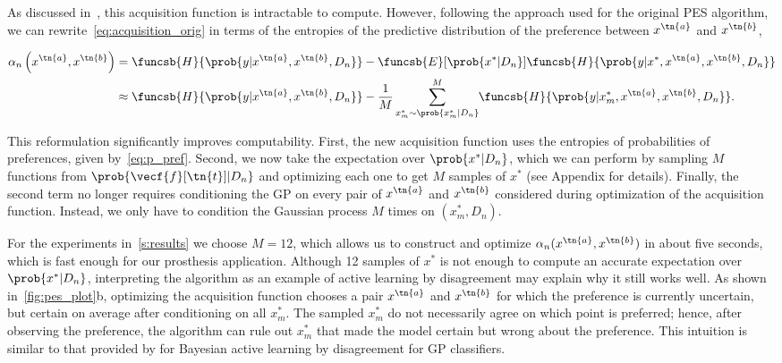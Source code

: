 As discussed in~\citep{hernandez2014predictive}, this acquisition function is
intractable to compute. However, following the approach used for the original
PES algorithm, we can rewrite~\cref{eq:acquisition_orig} in terms of the
entropies of the predictive distribution of the preference between $x^\tn{a}$
and $x^\tn{b}$,
\begin{fullwidth}
\begin{align}
    \alpha_n \left(x^\tn{a}, x^\tn{b} \right) &= 
        \funcsb{H}{\prob{y|x^\tn{a}, x^\tn{b}, D_n}}
            - \funcsb{E}[\prob{x^*|D_n}]{\funcsb{H}
            {\prob{y| x^*, x^\tn{a}, x^\tn{b}, D_n}}} \\
        &\approx \funcsb{H}{\prob{y|x^\tn{a}, x^\tn{b}, D_n}}
            - \frac{1}{M} \sum_{x_m^* \sim {\prob{x_m^*|D_n}}}^M 
            \hspace{-0.03in}\funcsb{H}{\prob{y| x_m^*, x^\tn{a},x^\tn{b},D_n}}.
        \label{eq:aq_approx}
\end{align}
\end{fullwidth}
This reformulation significantly improves computability. First, the new
acquisition function uses the entropies of probabilities of preferences, given
by~\cref{eq:p_pref}. Second, we now take the expectation over $\prob{x^*|D_n}$,
which we can perform by sampling $M$ functions from
$\prob{\vecf{f}[\tn{t}]|D_n}$ and optimizing each one to get $M$ samples of
$x^*$ (see Appendix for details). Finally, the second term no longer requires
conditioning the GP on every pair of $x^\tn{a}$ and $x^\tn{b}$ considered during
optimization of the acquisition function.  Instead, we only have to condition
the Gaussian process $M$ times on $(x_m^*, D_n)$.

For the experiments in~\cref{s:results} we choose $M = 12$, which allows us to
construct and optimize $\alpha_n(x^\tn{a}, x^\tn{b})$ in about five seconds,
which is fast enough for our prosthesis application. Although 12 samples of
$x^*$ is not enough to compute an accurate expectation over $\prob{x^*|D_n}$,
interpreting the algorithm as an example of active learning by disagreement may
explain why it still works well.  As shown in~\cref{fig:pes_plot}b, optimizing
the acquisition function chooses a pair $x^\tn{a}$ and $x^\tn{b}$ for which the
preference is currently uncertain, but certain on average after conditioning on
all $x_m^*$. The sampled $x_m^*$ do not necessarily agree on which point is
preferred; hence, after observing the preference, the algorithm can rule out
$x_m^*$ that made the model certain but wrong about the preference. This
intuition is similar to that provided by \citep{houlsby2012collaborative} for
Bayesian active learning by disagreement for GP classifiers.

